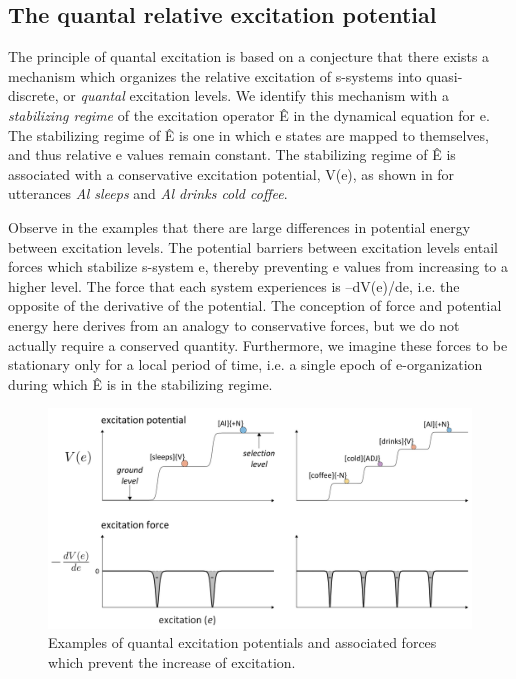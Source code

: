 \subsection{The quantal relative excitation potential}

The principle of quantal excitation is based on a conjecture that there exists a mechanism which organizes the relative excitation of s-systems into quasi-discrete, or \textit{quantal} excitation levels. We identify this mechanism with a \textit{stabilizing regime} of the excitation operator Ê in the dynamical equation for e. The stabilizing regime of Ê is one in which e states are mapped to themselves, and thus relative e values remain constant. The stabilizing regime of Ê is associated with a conservative excitation potential, V(e), as shown in {} for utterances \textit{Al sleeps} and \textit{Al drinks cold coffee}. 

  Observe in the examples that there are large differences in potential energy between excitation levels. The potential barriers between excitation levels entail forces which stabilize s-system e, thereby preventing e values from increasing to a higher level. The force that each system experiences is –dV(e)/de, i.e. the opposite of the derivative of the potential. The conception of force and potential energy here derives from an analogy to conservative forces, but we do not actually require a conserved quantity. Furthermore, we imagine these forces to be stationary only for a local period of time, i.e. a single epoch of e-organization during which Ê is in the stabilizing regime. 

  
\begin{figure}
\includegraphics[width=\textwidth]{figures/Tilsen-img23.png}
\caption{Examples of quantal excitation potentials and associated forces which prevent the increase of excitation.}
\label{fig:2:16}
\end{figure}
 

